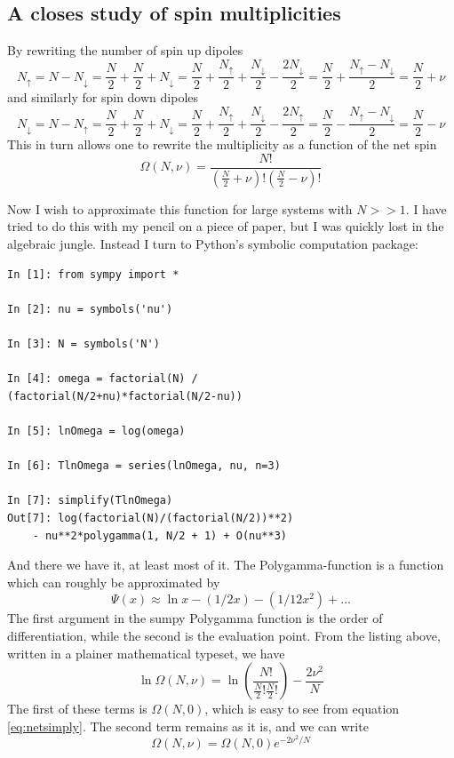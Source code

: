 \documentclass[10pt,a4paper]{amsart}
\begin{document}
\subsection{A closes study of spin multiplicities}
By rewriting the number of spin up dipoles
\begin{equation}
N_{\uparrow}=N-N_{\downarrow}=\frac{N}{2}+\frac{N}{2}+N_{\downarrow}
=\frac{N}{2}+\frac{N_{\uparrow}}{2}+\frac{N_{\downarrow}}{2}-\frac{2N_{\downarrow}}{2}=\frac{N}{2}+\frac{N_{\uparrow}-N_{\downarrow}}{2}=\frac{N}{2}+\nu
\end{equation}
and similarly for spin down dipoles
\begin{equation}
N_{\downarrow}=N-N_{\uparrow}=\frac{N}{2}+\frac{N}{2}+N_{\downarrow}
=\frac{N}{2}+\frac{N_{\uparrow}}{2}+\frac{N_{\downarrow}}{2}-\frac{2N_{\uparrow}}{2}=\frac{N}{2}-\frac{N_{\uparrow}-N_{\downarrow}}{2}=\frac{N}{2}-\nu
\end{equation}
This in turn allows one to rewrite the multiplicity as a function of the net spin
\begin{equation}
\label{eq:netsimply}
\Omega (N,\nu) = \frac{N!}{\left(\frac{N}{2} +\nu\right)!\left(\frac{N}{2} -\nu\right)!}
\end{equation}

Now I wish to approximate this function for large systems with $N>>1$. I have tried to do this with my pencil on a piece of paper, but I was quickly lost in the algebraic jungle. Instead I turn to Python's symbolic computation package:
\begin{lstlisting}
In [1]: from sympy import *

In [2]: nu = symbols('nu')

In [3]: N = symbols('N')

In [4]: omega = factorial(N) / 
(factorial(N/2+nu)*factorial(N/2-nu))

In [5]: lnOmega = log(omega)

In [6]: TlnOmega = series(lnOmega, nu, n=3)

In [7]: simplify(TlnOmega)
Out[7]: log(factorial(N)/(factorial(N/2))**2) 
	- nu**2*polygamma(1, N/2 + 1) + O(nu**3)
\end{lstlisting}
And there we have it, at least most of it. The Polygamma-function is a function which can roughly be approximated by
\begin{equation}
\Psi(x) \approx \ln x -(1/2x) - (1/12x^2) + \dots
\end{equation}
The first argument in the sumpy Polygamma function is the order of differentiation, while the second is the evaluation point. From the listing above, written in a plainer mathematical typeset, we have
\begin{equation}
\ln \Omega(N,\nu)= \ln \left( \frac{N!}{\frac{N}{2}!\frac{N}{2}!} \right) - \frac{2\nu^2}{N}
\end{equation}
The first of these terms is $\Omega(N,0)$, which is easy to see from equation \ref{eq:netsimply}. The second term remains as it is, and we can write
\begin{equation}
\label{eq:omegazero}
\Omega(N,\nu)=\Omega(N,0)e^{-2\nu^2/N}
\end{equation}
\end{document}
